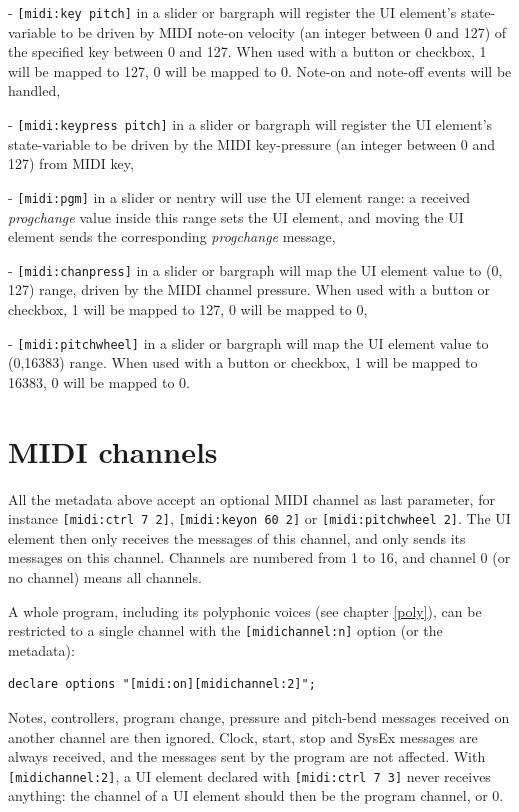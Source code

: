- \lstinline'[midi:key pitch]' in a slider or bargraph will register the UI element's state-variable to be driven by MIDI note-on velocity (an integer between 0 and 127) of the specified key between 0 and 127. When used with a button or checkbox, 1 will be mapped to 127, 0 will be mapped to 0.  Note-on and note-off events will be handled,

- \lstinline'[midi:keypress pitch]' in a slider or bargraph will register the UI element's state-variable to be driven by the MIDI key-pressure (an integer between 0 and 127) from MIDI key,

- \lstinline'[midi:pgm]' in a slider or nentry will use the UI element range: a received \emph{progchange} value inside this range sets the UI element, and moving the UI element sends the corresponding \emph{progchange} message,

- \lstinline'[midi:chanpress]' in a slider or bargraph will map the UI element value to (0, 127) range, driven by the MIDI channel pressure. When used with a button or checkbox, 1 will be mapped to 127, 0 will be mapped to 0,

- \lstinline'[midi:pitchwheel]' in a slider or bargraph will map the UI element value to (0,16383) range. When used with a button or checkbox, 1 will be mapped to 16383, 0 will be mapped to 0.

\section{MIDI channels}

All the metadata above accept an optional MIDI channel as last parameter, for instance \lstinline'[midi:ctrl 7 2]', \lstinline'[midi:keyon 60 2]' or \lstinline'[midi:pitchwheel 2]'. The UI element then only receives the messages of this channel, and only sends its messages on this channel. Channels are numbered from 1 to 16, and channel 0 (or no channel) means all channels.

A whole program, including its polyphonic voices (see chapter \ref{poly}), can be restricted to a single channel with the \lstinline'[midichannel:n]' option (or the  metadata):

\begin{lstlisting}
declare options "[midi:on][midichannel:2]";
\end{lstlisting}

Notes, controllers, program change, pressure and pitch-bend messages received on another channel are then ignored. Clock, start, stop and SysEx messages are always received, and the messages sent by the program are not affected. With \lstinline'[midichannel:2]', a UI element declared with \lstinline'[midi:ctrl 7 3]' never receives anything: the channel of a UI element should then be the program channel, or 0.

